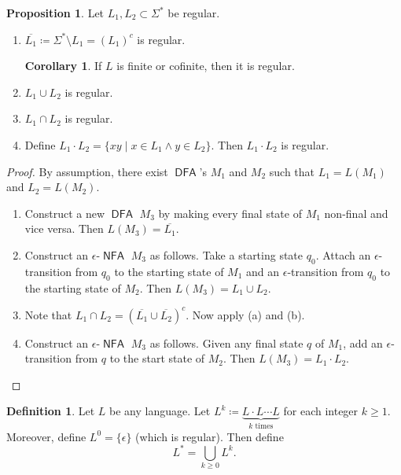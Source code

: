 \documentclass[10pt,letterpaper,cm]{nupset}
\theoremstyle{definition}
\newtheorem*{definition}{Definition}
\newtheorem{prop}{Proposition}
\newtheorem{corollary}{Corollary}
\newcommand{\1}{\mathbf{1}}
\newcommand{\0}{\vec 0}
\DeclareMathOperator{\DFA}{\mathsf{DFA}}
\DeclareMathOperator{\NFA}{\mathsf{NFA}}
\begin{document}
\begin{prop} Let $L_1, L_2\subset \Sigma^{\ast}$ be regular. 
\begin{enumerate}[label=(\alph*)]
\item $\overline{L_1}\coloneqq \Sigma^{\ast} \setminus L_1 = (L_1)^c$ is regular.
\begin{corollary}
If $L$ is finite or cofinite, then it is regular.
\end{corollary}
\item $L_1 \cup L_2$ is regular.
\item $L_1 \cap L_2$ is regular. 
\item Define $L_1\cdot L_2 = \{xy \mid x\in L_1 \land y\in L_2\}$. Then $L_1 \cdot L_2$ is regular. 
\end{enumerate}
\end{prop} 
\begin{proof} By assumption, there exist $\DFA$'s $M_1$ and $M_2$ such that $L_1 = L(M_1)$ and $L_2 = L(M_2)$.
\begin{enumerate}[label=(\alph*)]
\item Construct a new $\DFA$ $M_3$ by making every final state of $M_1$ non-final and vice versa. Then $L(M_3) = \overline{L_1}$.
\item Construct an $\epsilon$-$\NFA$ $M_3$ as follows. Take a starting state $q_0$. Attach  an $\epsilon$-transition  from $q_0$ to the starting state of $M_1$  and  an $\epsilon$-transition from $q_0$ to the starting state of $M_2$. Then $L(M_3) = L_1 \cup L_2$.
\item Note that $L_1 \cap L_2 = (\overline{L_1} \cup \overline{L_2})^c$.  Now apply (a) and (b).
\item Construct an $\epsilon$-$\NFA$ $M_3$ as follows. Given any final state $q$ of $M_1$, add an $\epsilon$-transition from $q$ to the start state of $M_2$. Then $L(M_3) = L_1\cdot L_2$.
\end{enumerate}
\end{proof}

\begin{definition}
Let $L$ be any language. Let $L^k \coloneqq \underbrace{L\cdot L \cdots L}_{k \text{ times}}$ for each integer $k\geq 1$. Moreover, define $L^0 = \{\epsilon\}$ (which is regular). Then define $$L^{\ast} = \bigcup_{k\geq 0} L^k.$$
\end{definition}
\end{document}
